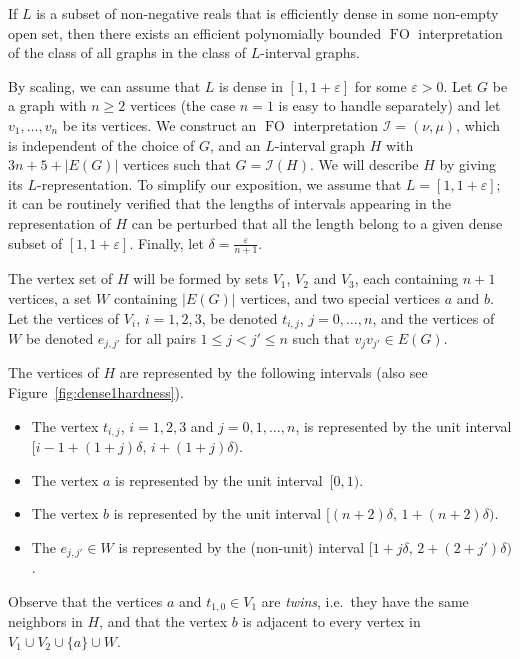 \documentclass{CSML}
\newcommand{\FO}{\ensuremath{\operatorname{FO}}\xspace}
\newcommand{\cI}{\mathcal{I}}
\theoremstyle{plain}\newtheorem{claim}[thm]{Claim}
\begin{document}
\begin{lem}
\label{lem:1epsFO}
If $L$ is a subset of non-negative reals that is efficiently dense in some non-empty open set,
then there exists an efficient polynomially bounded \FO interpretation of the class of all graphs
in the class of $L$-interval graphs.
\end{lem}
\proof
By scaling, we can assume that $L$ is dense in $[1,1+\varepsilon]$ for some $\varepsilon>0$.
Let $G$ be a graph with $n\ge 2$ vertices (the case $n=1$ is easy to handle separately) and let $v_1,\ldots,v_n$ be its vertices.
We construct an \FO interpretation $\cI=(\nu,\mu)$, which is independent of the choice of $G$, and
an $L$-interval graph $H$ with $3n+5+|E(G)|$ vertices such that $G=\cI(H)$.
We will describe $H$ by giving its $L$-representation.
To simplify our exposition, we assume that $L=[1,1+\varepsilon]$;
it can be routinely verified that the lengths of intervals appearing in the representation of $H$ can be perturbed that
all the length belong to a given dense subset of $[1,1+\varepsilon]$.
Finally, let $\delta=\frac{\varepsilon}{n+1}$.

The vertex set of $H$ will be formed by sets $V_1$, $V_2$ and $V_3$, each containing $n+1$ vertices,
a set $W$ containing $|E(G)|$ vertices, and two special vertices $a$ and $b$.
Let the vertices of $V_i$, $i=1,2,3$, be denoted $t_{i,j}$, $j=0,\ldots,n$, and
the vertices of $W$ be denoted $e_{j,j'}$ for all pairs $1\le j<j'\le n$ such that $v_jv_{j'}\in E(G)$.

The vertices of $H$ are represented by the following intervals (also see Figure~\ref{fig:dense1hardness}).
\begin{itemize}
\item The vertex $t_{i,j}$, $i=1,2,3$ and $j=0,1,\dots,n$,
      is represented by the unit interval $\big[i-1+(1+j)\delta,\,i+(1+j)\delta\big)$.
\item The vertex $a$ is represented by the unit interval $\,[0,1)$.
\item The vertex $b$ is represented by the unit interval $\big[(n+2)\delta,\,1+(n+2)\delta\big)$.
\item The $e_{j,j'}\in W$ is represented by the (non-unit) interval $\big[1+j\delta,\,2+(2+j')\delta\big)$.
\end{itemize}
Observe that the vertices $a$ and $t_{1,0}\in V_1$ are {\em twins}, i.e.~they have the same neighbors in $H$, and
that the vertex $b$ is adjacent to every vertex in $V_1\cup V_2\cup\{a\}\cup W$.
\end{document}

